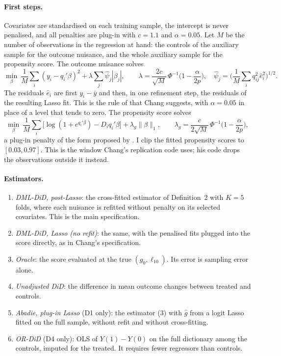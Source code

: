 \documentclass[11pt]{article}
\newenvironment{ins}{\begin{leftbar}}{\end{leftbar}}
\theoremstyle{plain}
\theoremstyle{remark}
\begin{document}
\begin{ins}
\paragraph{First steps.} Covariates are standardised on each training sample,
the intercept is never penalised, and all penalties are plug-in with $c=1.1$ and
$\alpha=0.05$. Let $M$ be the number of observations in the regression at hand:
the controls of the auxiliary sample for the outcome nuisance, and the whole
auxiliary sample for the propensity score. The outcome nuisance solves
\[
  \min_\beta\ \frac1M\sum_i(y_i-q_i'\beta)^2+\lambda\sum_j\hat\psi_j|\beta_j|,
  \qquad
  \lambda=\frac{2c}{\sqrt M}\,\Phi^{-1}\Big(1-\frac{\alpha}{2p}\Big),\quad
  \hat\psi_j=\Big(\frac1M\sum_iq_{ij}^2\hat e_i^2\Big)^{1/2}.
\]
The residuals $\hat e_i$ are first $y_i-\bar y$ and then, in one refinement
step, the residuals of the resulting Lasso fit. This is the rule of
\textcite{belloni2012sparse} that Chang suggests, with $\alpha=0.05$ in place of
a level that tends to zero. The propensity score solves
\[
  \min_\beta\ \frac1M\sum_i\big[\log(1+e^{q_i'\beta})-D_iq_i'\beta\big]+\lambda_g\lVert\beta\rVert_1,
  \qquad \lambda_g=\frac{c}{2\sqrt M}\,\Phi^{-1}\Big(1-\frac{\alpha}{2p}\Big),
\]
a plug-in penalty of the form proposed by \textcite{belloni2016post}. I clip the
fitted propensity scores to $[0.03,0.97]$. This is the window Chang's
replication code uses; his code drops the observations outside it instead.

\paragraph{Estimators.}
\begin{enumerate}
\item \emph{DML-DiD, post-Lasso}: the cross-fitted estimator of Definition~2 with
  $K=5$ folds, where each nuisance is refitted without penalty on its selected
  covariates. This is the main specification.
\item \emph{DML-DiD, Lasso (no refit)}: the same, with the penalised fits plugged
  into the score directly, as in Chang's specification.
\item \emph{Oracle}: the score evaluated at the true $(g_0,\ell_{10})$. Its error
  is sampling error alone.
\item \emph{Unadjusted DiD}: the difference in mean outcome changes between
  treated and controls.
\item \emph{Abadie, plug-in Lasso} (D1 only): the estimator (3) with $\hat g$ from
  a logit Lasso fitted on the full sample, without refit and without
  cross-fitting.
\item \emph{OR-DiD} (D4 only): OLS of $Y(1)-Y(0)$ on the full dictionary among the
  controls, imputed for the treated. It requires fewer regressors than controls.
\end{enumerate}


\end{ins}
\end{document}
